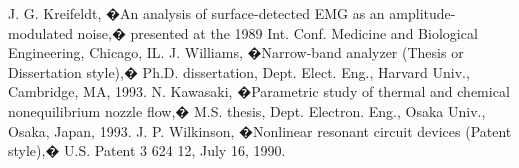 \documentclass[letterpaper, 10 pt, conference]{ieeeconf}  %
\begin{document}
\begin{thebibliography}{99}
 J. G. Kreifeldt, �An analysis of surface-detected EMG as an amplitude-modulated noise,� presented at the 1989 Int. Conf. Medicine and Biological Engineering, Chicago, IL.
 J. Williams, �Narrow-band analyzer (Thesis or Dissertation style),� Ph.D. dissertation, Dept. Elect. Eng., Harvard Univ., Cambridge, MA, 1993. 
 N. Kawasaki, �Parametric study of thermal and chemical nonequilibrium nozzle flow,� M.S. thesis, Dept. Electron. Eng., Osaka Univ., Osaka, Japan, 1993.
 J. P. Wilkinson, �Nonlinear resonant circuit devices (Patent style),� U.S. Patent 3 624 12, July 16, 1990. 






\end{thebibliography}
\end{document}
